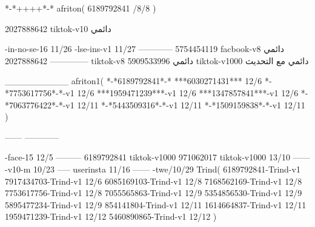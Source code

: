 *-*++++*-*
afriton(
6189792841 /8/8
)

2027888642 tiktok-v10
دائمي

-in-no-se-16 11/26
-lse-ins-v1 11/27
------------
5754454119 facbook-v8
دائمي
--------------
2027888642 tiktok-v8
دائمي
5909533996 tiktok-v1000
دائمي مع التحديث

__________
afriton1(
*-*6189792841*-*
***6030271431*** 12/6
*-*7753617756*-*-v1 12/6
***1959471239***-v1 12/6
***1347857841***-v1 12/6
*-*7063776422*-*-v1 12/11
*-*5443509316*-*-v1 12/11
*-*1509159838*-*-v1 12/11
)

------
------------


-face-15 12/5
---------
6189792841 tiktok-v1000
971062017 tiktok-v1000 13/10
------
-v10-m 10/23
-----
userinsta 11/16
------
-twe/10/29
Trind(
6189792841-Trind-v1 
7917434703-Trind-v1 12/6
6085169103-Trind-v1 12/8
7168562169-Trind-v1 12/8
7753617756-Trind-v1 12/8
7055565863-Trind-v1 12/9
5354856530-Trind-v1 12/9
5895477234-Trind-v1 12/9
854141804-Trind-v1 12/11
1614664837-Trind-v1 12/11
1959471239-Trind-v1 12/12
5460890865-Trind-v1 12/12
)
